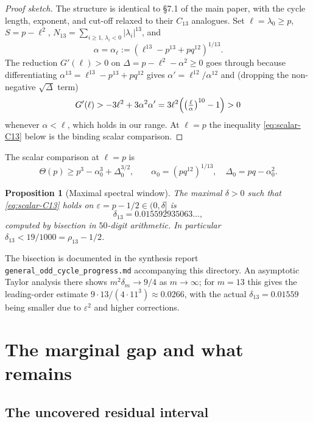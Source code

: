\documentclass[11pt]{article}
\newtheorem{proposition}[theorem]{Proposition}
\newcommand{\eps}{\varepsilon}
\begin{document}
\begin{proof}[Proof sketch]
The structure is identical to \S 7.1 of the main paper, with the cycle length, exponent, and cut-off relaxed to their $C_{13}$ analogues.  Set $\ell = \lambda_0 \ge p$, $S = p - \ell^2$, $N_{13} = \sum_{i \ge 1,\, \lambda_i < 0} |\lambda_i|^{13}$, and
\[
        \alpha = \alpha_\ell := (\ell^{13} - p^{13} + p q^{12})^{1/13}.
\]
The reduction $G'(\ell) > 0$ on $\Delta = p - \ell^2 - \alpha^2 \ge 0$ goes through because differentiating $\alpha^{13} = \ell^{13} - p^{13} + p q^{12}$ gives $\alpha' = \ell^{12}/\alpha^{12}$ and (dropping the non-negative $\sqrt{\Delta}$ term)
\[
        G'(\ell) > -3\ell^2 + 3 \alpha^2 \alpha' = 3 \ell^2 \Bigl(\bigl(\tfrac{\ell}{\alpha}\bigr)^{10} - 1\Bigr) > 0
\]
whenever $\alpha < \ell$, which holds in our range.  At $\ell = p$ the inequality \eqref{eq:scalar-C13} below is the binding scalar comparison.
\end{proof}

The scalar comparison at $\ell = p$ is
\begin{equation}\label{eq:scalar-C13}
        \Theta(p) \ge p^3 - \alpha_0^3 + \Delta_0^{3/2},
        \qquad \alpha_0 = (p q^{12})^{1/13},\quad \Delta_0 = pq - \alpha_0^2.
\end{equation}

\begin{proposition}[Maximal spectral window]\label{prop:delta13}
The maximal $\delta > 0$ such that \eqref{eq:scalar-C13} holds on $\eps = p - 1/2 \in (0, \delta]$ is
\[
        \delta_{13} = 0.015592935063\ldots,
\]
computed by bisection in $50$-digit arithmetic.  In particular $\delta_{13} < 19/1000 = \rho_{13} - 1/2$.
\end{proposition}

The bisection is documented in the synthesis report \texttt{general\_odd\_cycle\_progress.md} accompanying this directory.  An asymptotic Taylor analysis there shows $m^2 \delta_m \to 9/4$ as $m \to \infty$; for $m = 13$ this gives the leading-order estimate $9 \cdot 13 / (4 \cdot 11^3) \approx 0.0266$, with the actual $\delta_{13} = 0.01559$ being smaller due to $\eps^2$ and higher corrections.

\section{The marginal gap and what remains}\label{sec:remains}

\subsection{The uncovered residual interval}
\end{document}

